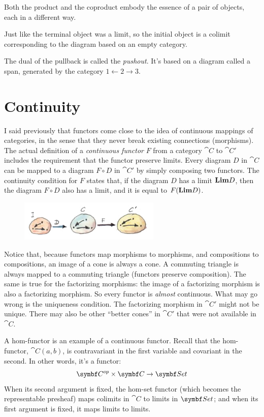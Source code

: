 \noindent
Both the product and the coproduct embody the essence of a pair of
objects, each in a different way.

Just like the terminal object was a limit, so the initial object is a
colimit corresponding to the diagram based on an empty category.

The dual of the pullback is called the \emph{pushout}. It's based on a
diagram called a span, generated by the category
$1\leftarrow2\rightarrow3$.

\section{Continuity}

I said previously that functors come close to the idea of continuous
mappings of categories, in the sense that they never break existing
connections (morphisms). The actual definition of a \emph{continuous
  functor} $F$ from a category $\cat{C}$ to $\cat{C'}$ includes the
requirement that the functor preserve limits. Every diagram $D$
in $\cat{C}$ can be mapped to a diagram $F \circ D$ in $\cat{C'}$ by
simply composing two functors. The continuity condition for $F$
states that, if the diagram $D$ has a limit $\Lim[D]$, then
the diagram $F \circ D$ also has a limit, and it is equal to
$F (\Lim[D])$.

\begin{figure}[H]
  \centering
  \includegraphics[width=0.6\textwidth]{images/continuity.jpg}
\end{figure}

\noindent
Notice that, because functors map morphisms to morphisms, and
compositions to compositions, an image of a cone is always a cone. A
commuting triangle is always mapped to a commuting triangle (functors
preserve composition). The same is true for the factorizing morphisms:
the image of a factorizing morphism is also a factorizing morphism. So
every functor is \emph{almost} continuous. What may go wrong is the
uniqueness condition. The factorizing morphism in $\cat{C'}$ might not be
unique. There may also be other ``better cones'' in $\cat{C'}$ that were
not available in $\cat{C}$.

A hom-functor is an example of a continuous functor. Recall that the
hom-functor, $\cat{C}(a, b)$, is contravariant in the first variable
and covariant in the second. In other words, it's a functor:
\[\cat{C}^{op} \times \cat{C} \to \Set\]
When its second argument is fixed, the hom-set functor (which becomes
the representable presheaf) maps colimits in $\cat{C}$ to limits in
$\Set$; and when its first argument is fixed, it maps limits to
limits.

